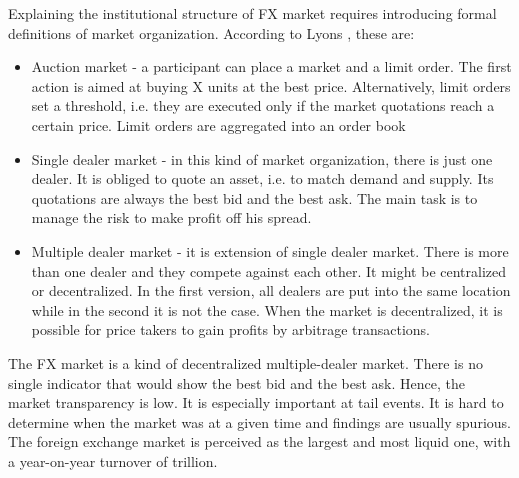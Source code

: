 \documentclass{pracamgr_wne}\usepackage[]{graphicx}\usepackage[]{color}
\begin{document}
Explaining the institutional structure of FX market requires introducing formal definitions of market organization. According  to Lyons \cite{Lyons2002}, these are:
\begin{itemize}
\item Auction market - a participant can place a market and a limit order. The first action is aimed at buying X units at the best price. Alternatively, limit orders set a threshold, i.e. they are executed only if the market quotations reach a certain price. Limit orders are aggregated into an order book
\item Single dealer market - in this kind of market organization, there is just one dealer. It is obliged to quote an asset, i.e. to match demand and supply. Its quotations are always the best bid and the best ask. The main task is to manage the risk to make profit off his spread.
\item Multiple dealer market - it is extension of single dealer market. There is more than one dealer and they compete against each other. It might be centralized or decentralized. In the first version, all dealers are put into the same location while in the second it is not the case. When the market is decentralized, it is possible for price takers to gain profits by arbitrage transactions.
\end{itemize}
The FX market is a kind of decentralized multiple-dealer market. There is no single indicator that would show the best bid and the best ask. Hence, the market transparency is low. It is especially important at tail events. It is hard to determine when the market was at a given time and findings are usually spurious.
The foreign exchange market is perceived as the largest and most liquid one, with a year-on-year turnover of  trillion. 
\end{document}
